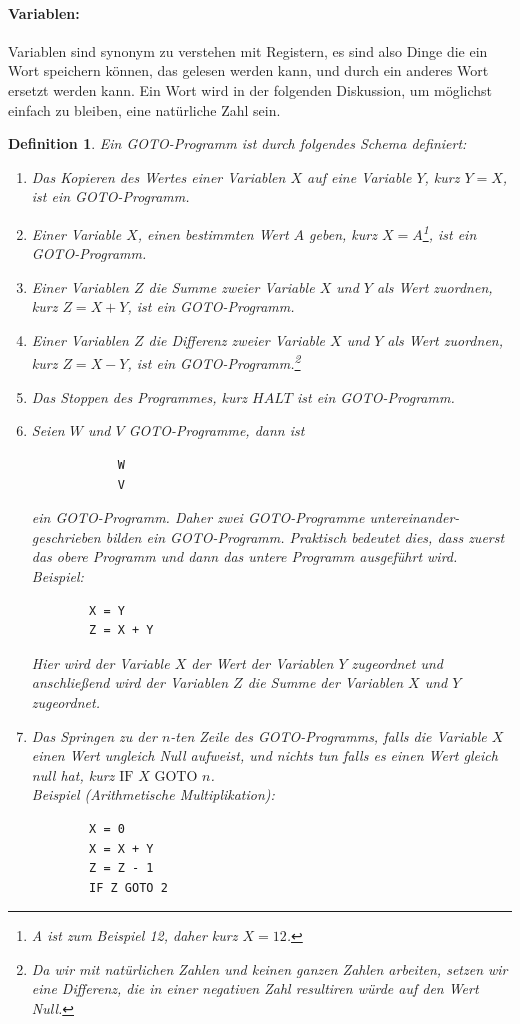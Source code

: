 \documentclass[11pt,a4paper,leqno]{report}
\newtheorem{definition}[theorem]{Definition}
\numberwithin{equation}{chapter}
\begin{document}
\paragraph{Variablen:} Variablen sind synonym zu verstehen mit Registern, es sind also Dinge die ein Wort speichern k\"onnen, das gelesen werden kann, und durch ein anderes Wort ersetzt werden kann. Ein Wort wird in der folgenden Diskussion, um m\"oglichst einfach zu bleiben, eine nat\"urliche Zahl sein. \\
\begin{definition}
	Ein GOTO-Programm ist durch folgendes Schema definiert:
	\begin{enumerate}
		\item Das Kopieren des Wertes einer Variablen $X$ auf eine Variable $Y$, kurz $Y = X$, ist ein GOTO-Programm.
		\item Einer Variable $X$, einen bestimmten Wert $A$ geben, kurz $X = A$\footnote{A ist zum Beispiel 12, daher kurz $X = 12$.}, ist ein GOTO-Programm.
		\item Einer Variablen $Z$ die Summe zweier Variable $X$ und $Y$ als Wert zuordnen, kurz $Z = X + Y$, ist ein GOTO-Programm.
		\item Einer Variablen $Z$ die Differenz zweier Variable $X$ und $Y$ als Wert zuordnen, kurz $Z = X - Y$, ist ein GOTO-Programm.\footnote{Da wir mit nat\"urlichen Zahlen und keinen ganzen Zahlen arbeiten, setzen wir eine Differenz, die in einer negativen Zahl resultiren w\"urde auf den Wert Null.}
		\item Das Stoppen des Programmes, kurz $HALT$ ist ein GOTO-Programm.
		\newpage
		\item Seien $W$ und $V$ GOTO-Programme, dann ist
		\begin{lstlisting}
			W
			V
		\end{lstlisting}
		ein GOTO-Programm. Daher zwei GOTO-Programme untereinander- geschrieben bilden ein GOTO-Programm. Praktisch bedeutet dies, dass zuerst das obere Programm und dann das untere Programm ausgef\"uhrt wird. Beispiel:
		\begin{lstlisting}
		X = Y
		Z = X + Y
		\end{lstlisting}
		Hier wird der Variable $X$ der Wert der Variablen $Y$ zugeordnet und anschlie\ss{}end wird der Variablen $Z$ die Summe der Variablen $X$ und $Y$ zugeordnet.
		\item Das Springen zu der $n$-ten Zeile des GOTO-Programms, falls die Variable $X$ einen Wert ungleich Null aufweist, und nichts tun falls es einen Wert gleich null hat, kurz $\text{IF }X\text{ GOTO }n$.\\
		Beispiel (Arithmetische Multiplikation): 
		\begin{lstlisting}
		X = 0
		X = X + Y
		Z = Z - 1
		IF Z GOTO 2
		\end{lstlisting}
	\end{enumerate}
\end{definition}	
\end{document}

